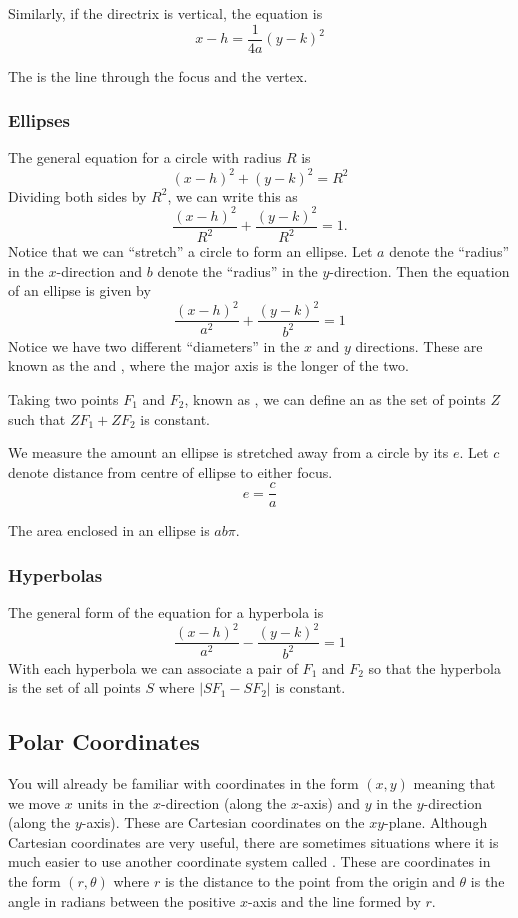 Similarly, if the directrix is vertical, the equation is
\[ x-h=\frac{1}{4a}(y-k)^2 \]

The  is the line through the focus and the vertex.

\subsubsection{Ellipses}
The general equation for a circle with radius $R$ is
\begin{equation}
(x-h)^2+(y-k)^2=R^2
\end{equation}
Dividing both sides by $R^2$, we can write this as 
\[ \frac{(x-h)^2}{R^2}+\frac{(y-k)^2}{R^2}=1. \]
Notice that we can ``stretch'' a circle to form an ellipse. Let $a$ denote the ``radius'' in the $x$-direction and $b$ denote the ``radius'' in the $y$-direction. Then the equation of an ellipse is given by
\begin{equation}\label{eqn:ellipse}
\frac{(x-h)^2}{a^2}+\frac{(y-k)^2}{b^2}=1
\end{equation}
Notice we have two different ``diameters'' in the $x$ and $y$ directions. These are known as the  and , where the major axis is the longer of the two.

Taking two points $F_1$ and $F_2$, known as , we can define an  as the set of points $Z$ such that $ZF_1+ZF_2$ is constant.

We measure the amount an ellipse is stretched away from a circle by its  $e$. Let $c$ denote distance from centre of ellipse to either focus.
\begin{equation}
e=\frac{c}{a}
\end{equation}

The area enclosed in an ellipse is $ab\pi$.

\subsubsection{Hyperbolas}
The general form of the equation for a hyperbola is 
\begin{equation}
\frac{(x-h)^2}{a^2}-\frac{(y-k)^2}{b^2}=1
\end{equation}
With each hyperbola we can associate a pair of  $F_1$ and $F_2$ so that the hyperbola is the set of all points $S$ where $|SF_1-SF_2|$ is constant.
\pagebreak

\subsection{Polar Coordinates}
You will already be familiar with coordinates in the form $(x, y)$ meaning that we move $x$ units in the $x$-direction (along the $x$-axis) and $y$ in the $y$-direction (along the $y$-axis). These are Cartesian coordinates on the $xy$-plane. Although Cartesian coordinates are very useful, there are sometimes situations where it is much easier to use another coordinate system called . These are coordinates in the form $(r,\theta)$ where $r$ is the distance to the point from the origin and $\theta$ is the angle in radians between the positive $x$-axis and the line formed by $r$.

